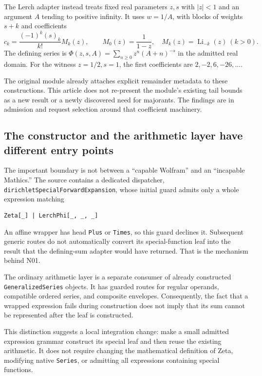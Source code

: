 \documentclass[11pt,letterpaper]{article}
\newcommand{\code}[1]{\nolinkurl{#1}}
\begin{document}
The Lerch adapter instead treats fixed real parameters $z,s$ with $|z|<1$ and
an argument $A$ tending to positive infinity. It uses $w=1/A$, with blocks of
weights $s+k$ and coefficients
\begin{equation}\label{eq:lerch-coeff}
 c_k=\frac{(-1)^k(s)_k}{k!}M_k(z),\qquad
 M_0(z)=\frac1{1-z},\quad M_k(z)=\operatorname{Li}_{-k}(z)\ (k>0).
\end{equation}
The defining series is $\Phi(z,s,A)=\sum_{n\geq0}z^n(A+n)^{-s}$ in the admitted
real domain. For the witness $z=1/2,s=1$, the first coefficients are
$2,-2,6,-26,\ldots$.~\cite{dirichlet,dlmf-lerch}

The original module already attaches explicit remainder metadata to these
constructions. This article does not re-present the module's existing tail
bounds as a new result or a newly discovered need for majorants. The findings
are in admission and request selection around that coefficient machinery.

\subsection{The constructor and the arithmetic layer have different entry points}
The important boundary is not between a ``capable Wolfram'' and an ``incapable
Mathics.'' The source contains a dedicated dispatcher,
\code{dirichletSpecialForwardExpansion}, whose initial guard admits only a
whole expression matching
\begin{lstlisting}
Zeta[_] | LerchPhi[_, _, _]
\end{lstlisting}
An affine wrapper has head \code{Plus} or \code{Times}, so this guard declines it.
Subsequent generic routes do not automatically convert its special-function
leaf into the result that the defining-sum adapter would have returned.
That is the mechanism behind N01.~\cite{dirichlet}

The ordinary arithmetic layer is a separate consumer of already constructed
\code{GeneralizedSeries} objects. It has guarded routes for regular operands,
compatible ordered series, and composite envelopes. Consequently, the fact
that a wrapped expression fails during construction does not imply that its
sum cannot be represented after the leaf is constructed.~\cite{arithmetic,envelope,operations}

This distinction suggests a local integration change: make a small admitted
expression grammar construct its special leaf and then reuse the existing
arithmetic. It does not require changing the mathematical definition of
Zeta, modifying native \code{Series}, or admitting all expressions containing
special functions.
\end{document}
